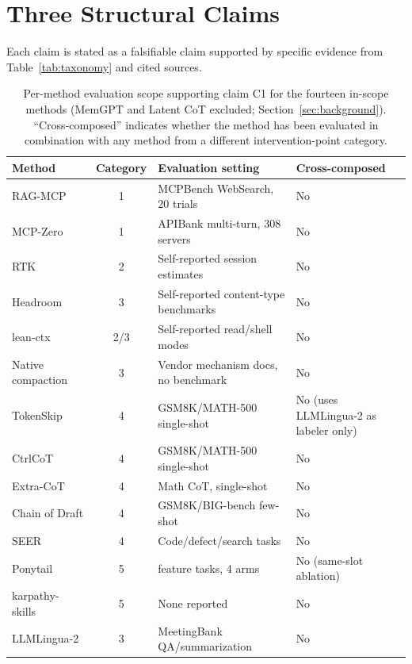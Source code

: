 \documentclass{article}
\begin{document}
\section{Three Structural Claims}
\label{sec:claims}

Each claim is stated as a falsifiable claim supported by specific evidence from Table~\ref{tab:taxonomy} and cited sources.

\begin{table}[!htbp]
\caption{Per-method evaluation scope supporting claim C1 for the fourteen in-scope methods (MemGPT and Latent CoT excluded; Section~\ref{sec:background}). ``Cross-composed'' indicates whether the method has been evaluated in combination with any method from a different intervention-point category.}
\label{tab:c1_evidence}
\centering
\footnotesize
\begin{tabularx}{\textwidth}{@{}>{\raggedright\arraybackslash}p{3.3cm}c>{\raggedright\arraybackslash}X>{\raggedright\arraybackslash}X@{}}
\toprule
Method & Category & Evaluation setting & Cross-composed \\
\midrule
RAG-MCP & 1 & MCPBench WebSearch, 20 trials & No \\
MCP-Zero & 1 & APIBank multi-turn, 308 servers & No \\
RTK~\citep{rtk2024} & 2 & Self-reported session estimates & No \\
Headroom~\citep{headroom2025} & 3 & Self-reported content-type benchmarks & No \\
lean-ctx~\citep{leancxt2025} & 2/3 & Self-reported read/shell modes & No \\
Native compaction~\citep{nativecompaction2025} & 3 & Vendor mechanism docs, no benchmark & No \\
TokenSkip & 4 & GSM8K/MATH-500 single-shot & No (uses LLMLingua-2 as labeler only) \\
CtrlCoT & 4 & GSM8K/MATH-500 single-shot & No \\
Extra-CoT & 4 & Math CoT, single-shot & No \\
Chain of Draft & 4 & GSM8K/BIG-bench few-shot & No \\
SEER & 4 & Code/defect/search tasks & No \\
Ponytail & 5 & 12 feature tasks, 4 arms & No (same-slot ablation) \\
karpathy-skills~\citep{karpathy2025skills} & 5 & None reported & No \\
LLMLingua-2 & 3 & MeetingBank QA/summarization & No \\
\bottomrule
\end{tabularx}
\end{table}
\end{document}
